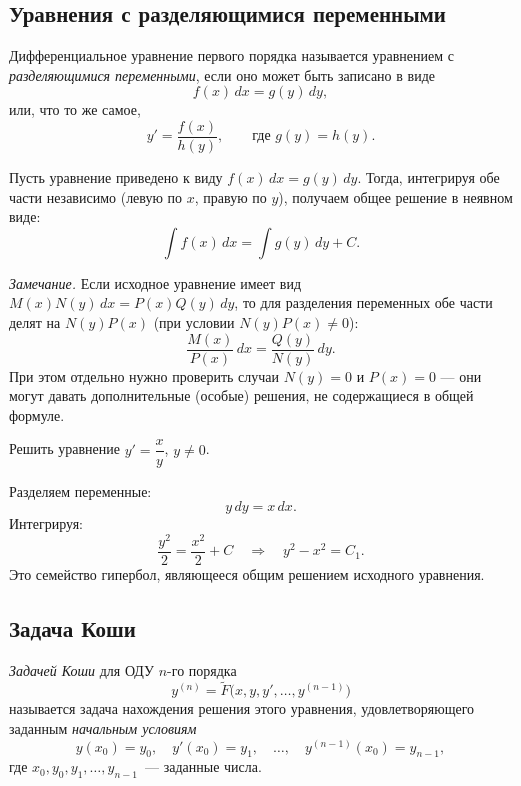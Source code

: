 \documentclass[12pt]{article}
\begin{document}
        \subsection{Уравнения с разделяющимися переменными}

    \begin{definition}
    	Дифференциальное уравнение первого порядка называется уравнением с \emph{разделяющимися переменными}, если оно может быть записано в виде
    	\[
    		f(x)\,dx = g(y)\,dy,
    	\]
    	или, что то же самое,
    	\[
    		y' = \frac{f(x)}{h(y)}, \qquad \text{где } g(y) = h(y).
    	\]
    \end{definition}

    \begin{method}
    	Пусть уравнение приведено к виду $f(x)\,dx = g(y)\,dy$. Тогда, интегрируя обе части независимо (левую по $x$, правую по $y$), получаем общее решение в неявном виде:
    	\[
    		\int f(x)\,dx = \int g(y)\,dy + C.
    	\]
    	
    	\emph{Замечание.} Если исходное уравнение имеет вид $M(x)N(y)\,dx = P(x)Q(y)\,dy$, то для разделения переменных обе части делят на $N(y)P(x)$ (при условии $N(y)P(x) \ne 0$):
    	\[
    		\frac{M(x)}{P(x)}\,dx = \frac{Q(y)}{N(y)}\,dy.
    	\]
    	При этом отдельно нужно проверить случаи $N(y) = 0$ и $P(x) = 0$ — они могут давать дополнительные (особые) решения, не содержащиеся в общей формуле.
    \end{method}

    \begin{example}
    	Решить уравнение $y' = \dfrac{x}{y}$, $y \ne 0$.
    	
    	Разделяем переменные:
    	\[
    		y\,dy = x\,dx.
    	\]
    	Интегрируя:
    	\[
    		\frac{y^2}{2} = \frac{x^2}{2} + C \quad\Longrightarrow\quad y^2 - x^2 = C_1.
    	\]
    	Это семейство гипербол, являющееся общим решением исходного уравнения.
    \end{example}

    \subsection{Задача Коши}

    \begin{definition}
    	\emph{Задачей Коши} для ОДУ $n$-го порядка
    	\[
    		y^{(n)} = \tilde{F}\bigl(x, y, y', \dots, y^{(n-1)}\bigr)
    	\]
    	называется задача нахождения решения этого уравнения, удовлетворяющего заданным \emph{начальным условиям}
    	\[
    		y(x_0) = y_0, \quad y'(x_0) = y_1, \quad \dots, \quad y^{(n-1)}(x_0) = y_{n-1},
    	\]
    	где $x_0, y_0, y_1, \dots, y_{n-1}$~--- заданные числа.
    \end{definition}
\end{document}
